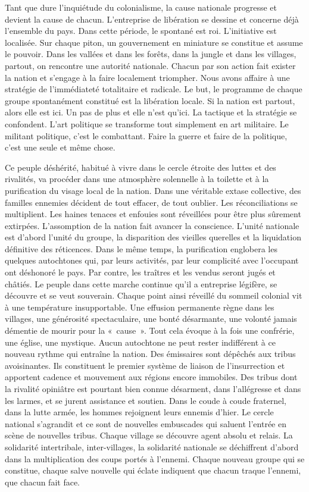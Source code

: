 \documentclass[french,twoside]{book} %
\begin{document}
Tant que dure l’inquiétude du colonialisme, la cause nationale progresse et devient la cause de chacun. L’entreprise de libération se dessine et concerne déjà l’ensemble du pays. Dans cette période, le spontané est roi. L’initiative est localisée. Sur chaque piton, un gouvernement en miniature se constitue et assume le pouvoir. Dans les vallées et dans les forêts, dans la jungle et dans les villages, partout, on rencontre une autorité nationale. Chacun par son action fait exister la nation et s’engage à la faire localement triompher. Nous avons affaire à une stratégie de l’immédiateté totalitaire et radicale. Le but, le programme   de chaque groupe spontanément constitué est la libération locale. Si la nation est partout, alors elle est ici. Un pas de plus et elle n’est qu’ici. La tactique et la stratégie se confondent. L’art politique se transforme tout simplement en art militaire. Le militant politique, c’est le combattant. Faire la guerre et faire de la politique, c’est une seule et même chose.\par
\bigbreak
\noindent Ce peuple déshérité, habitué à vivre dans le cercle étroite des luttes et des rivalités, va procéder dans une atmosphère solennelle à la toilette et à la purification du visage local de la nation. Dans une véritable extase collective, des familles ennemies décident de tout effacer, de tout oublier. Les réconciliations se multiplient. Les haines tenaces et enfouies sont réveillées pour être plus sûrement extirpées. L’assomption de la nation fait avancer la conscience. L’unité nationale est d’abord l’unité du groupe, la disparition des vieilles querelles et la liquidation définitive des réticences. Dans le même temps, la purification englobera les quelques autochtones qui, par leurs activités, par leur complicité avec l’occupant ont déshonoré le pays. Par contre, les traîtres et les vendus seront jugés et châtiés. Le peuple dans cette marche continue qu’il a entreprise légifère, se découvre et se veut souverain. Chaque point ainsi réveillé du sommeil colonial vit à une température insupportable. Une effusion permanente règne dans les villages, une générosité spectaculaire, une bonté désarmante, une volonté jamais démentie de mourir pour la « cause ». Tout cela évoque à la fois une confrérie, une église, une mystique. Aucun autochtone ne peut rester indifférent à ce nouveau rythme qui entraîne la nation. Des émissaires sont dépêchés aux tribus avoisinantes. Ils constituent le premier système de liaison de l’insurrection et apportent cadence et mouvement aux régions encore immobiles. Des tribus dont la rivalité opiniâtre est pourtant bien connue désarment, dans l’allégresse et dans les larmes, et se jurent assistance et soutien. Dans le coude à coude fraternel, dans la lutte armée, les hommes rejoignent leurs ennemis d’hier. Le cercle national s’agrandit et ce sont de nouvelles embuscades qui saluent l’entrée   en scène de nouvelles tribus. Chaque village se découvre agent absolu et relais. La solidarité intertribale, inter-villages, la solidarité nationale se déchiffrent d’abord dans la multiplication des coups portés à l’ennemi. Chaque nouveau groupe qui se constitue, chaque salve nouvelle qui éclate indiquent que chacun traque l’ennemi, que chacun fait face.\par
\end{document}
